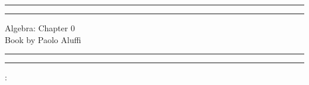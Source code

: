 \documentclass[a4paper, 11pt]{book}
\theoremstyle{plain}
\theoremstyle{plain}
\begin{document}
  \begin{titlepage}
	\centering %
	\scshape %
	\vspace*{1.5\baselineskip} %

	\rule{13cm}{1.6pt}\vspace*{-\baselineskip}\vspace*{2pt} %
	\rule{13cm}{0.4pt} %
	
		\vspace{0.75\baselineskip} %
	{	\Huge Algebra: Chapter 0\\ 
			\vspace{4mm}
		Book by Paolo Aluffi \\	}
		\vspace{0.75\baselineskip} %
	\rule{13cm}{0.4pt}\vspace*{-\baselineskip}\vspace{3.2pt} %
	\rule{13cm}{1.6pt} %
	
		\vspace{1.75\baselineskip} %
	{\large : 
		\vspace*{1.2\baselineskip}
	} \\
	\vfill

\end{titlepage}
\begingroup
\let\cleardoublepage\clearpage
\tableofcontents
\endgroup
{}
\end{document}
